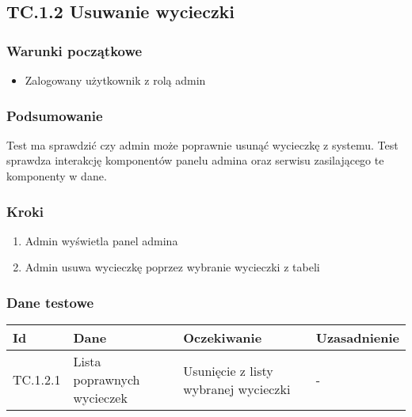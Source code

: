 \documentclass[a4paper,15pt]{article}
\begin{document}
\newpage
\begin{framed}
\subsection{TC.1.2 Usuwanie wycieczki}

\vspace{0.5cm}

\subsubsection{Warunki początkowe}
\begin{itemize}
\item Zalogowany użytkownik z rolą admin
\end{itemize}

\subsubsection{Podsumowanie}
Test ma sprawdzić czy admin może poprawnie usunąć wycieczkę z systemu. Test sprawdza interakcję komponentów panelu admina oraz serwisu zasilającego te komponenty w dane. 

\subsubsection{Kroki}
\begin{enumerate}
\item Admin wyświetla panel admina
\item Admin usuwa wycieczkę poprzez wybranie wycieczki z tabeli
\end{enumerate}

\subsubsection{Dane testowe}

\begin{center}
\begin{tabular}{ |C{1.5cm}|C{3cm}|C{4cm}|C{4cm}| } 
 \hline
 \textbf{Id} & \textbf{Dane} & \textbf{Oczekiwanie} & \textbf{Uzasadnienie} \\ \hline
 TC.1.2.1 & Lista poprawnych wycieczek & Usunięcie z listy wybranej wycieczki & - \\ \hline
\end{tabular}
\end{center}






\newpage
\end{framed}
\end{document}

